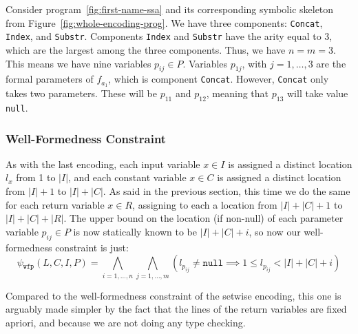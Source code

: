 \begin{example}
  Consider program~\ref{fig:first-name-ssa} and its corresponding symbolic
  skeleton from Figure~\ref{fig:whole-encoding-prog}.
  We have three components: \lstinline{Concat}, \lstinline{Index}, and
  \lstinline{Substr}.
  Components \lstinline{Index} and \lstinline{Substr} have the arity equal to 3,
  which are the largest among the three components.
  Thus, we have $n = m = 3$. This means we have nine variables $p_{ij} \in P$.
  Variables $p_{1j}$, with $j = 1, \ldots, 3$ are the formal parameters of
  $f_{a_1}$, which is component \lstinline{Concat}.
  However, \lstinline{Concat} only takes two parameters.
  These will be $p_{11}$ and $p_{12}$, meaning that $p_{13}$ will take value
  \lstinline{null}.
\end{example}

\subsubsection{Well-Formedness Constraint}
\label{sec:whole-well-formedness-constraint}

As with the last encoding, each input variable $x \in I$ is assigned a distinct
location $l_x$ from 1 to $|I|$, and each constant variable $x \in C$ is assigned
a distinct location from $|I| + 1$ to $|I| + |C|$.
As said in the previous section, this time we do the same for each return
variable $x \in R$, assigning to each a location from $|I| + |C| + 1$ to
$|I| + |C| + |R|$.
The upper bound on the location (if non-null) of each parameter variable $p_{ij}
\in P$ is now statically known to be $|I| + |C| + i$, so now our well-formedness
constraint is just:
%
\[
  \psi{}_{\mathtt{wfp}}(L,C,I,P) =
  \bigwedge_{i = 1, \ldots, n}\bigwedge_{j = 1, \ldots, m}
  (l_{p_{ij}} \neq \mathtt{null} \implies 1 \leq l_{p_{ij}} < |I| + |C| + i)
\]

\noindent
Compared to the well-formedness constraint of the setwise encoding, this one is
arguably made simpler by the fact that the lines of the return variables are
fixed apriori, and because we are not doing any type checking.

